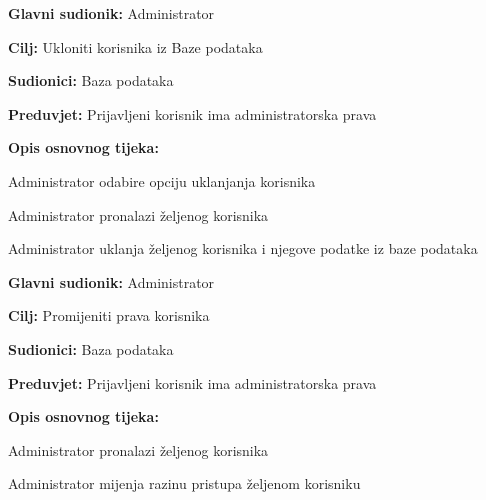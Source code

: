 \noindent {}
\begin{packed_item}

\item \textbf{Glavni sudionik: }Administrator
\item  \textbf{Cilj:} Ukloniti korisnika iz Baze podataka
\item  \textbf{Sudionici:} Baza podataka
\item  \textbf{Preduvjet:} Prijavljeni korisnik ima administratorska prava
\item  \textbf{Opis osnovnog tijeka:}

\item[] \begin{packed_enum}
	
	\item Administrator odabire opciju uklanjanja korisnika
	\item Administrator pronalazi željenog korisnika
	\item Administrator uklanja željenog korisnika i njegove podatke iz baze podataka
	
\end{packed_enum}

\end{packed_item}

\noindent {}
\begin{packed_item}

\item \textbf{Glavni sudionik: }Administrator
\item  \textbf{Cilj:} Promijeniti prava korisnika
\item  \textbf{Sudionici:} Baza podataka 						
\item  \textbf{Preduvjet:} Prijavljeni korisnik ima administratorska prava
\item  \textbf{Opis osnovnog tijeka:}

\item[] \begin{packed_enum}
	
	\item Administrator pronalazi željenog korisnika
	\item Administrator mijenja razinu pristupa željenom korisniku
	
	
\end{packed_enum}

\end{packed_item}

